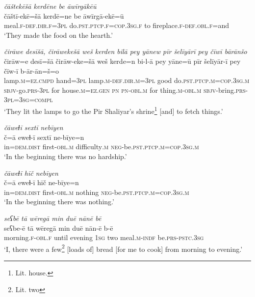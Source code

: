 \ea \label{ŽE.39}
\textit{čāštekēšā kerdēne be āwīrgākēū} \\ 
\gll čāštī-ekē=šā kerdē=ne be āwīrgā-ekē=ū \\ 
 meal\textsc{.f}\textsc{-def}\textsc{.dir}\textsc{.f}\textsc{=3pl} do\textsc{.pst}\textsc{.ptcp}\textsc{.f}\textsc{=cop}\textsc{.3sg}\textsc{.f} to fireplace\textsc{.f}\textsc{-def}\textsc{.obl}\textsc{.f}=and \\ 
\glt `They made the food on the hearth.'
\z 
 
\ea \label{ŽE.42}
\textit{čirāwe desīšā, čirāwekešā weš kerden bilā pey yānew pīr šelīyārī pey čīwī bārānšo} \\ 
\gll čirāw=e desī=šā čirāw-eke=šā weš kerde=n bi-l-ā pey yāne=ū pīr šelīyār-ī pey čīw-ī b-ār-ān=š=o \\ 
 lamp\textsc{.m}\textsc{=ez}\textsc{.cmpd} hand\textsc{=3pl} lamp\textsc{.m}\textsc{-def}\textsc{.dir}\textsc{.m}\textsc{=3pl} good do\textsc{.pst}\textsc{.ptcp}\textsc{.m}\textsc{=cop}\textsc{.3sg}\textsc{.m} \textsc{sbjv-}go\textsc{.prs}\textsc{-3pl} for house\textsc{.m}\textsc{\textsc{=ez.gen}} \textsc{pn} \textsc{pn}\textsc{-obl}\textsc{.m} for thing\textsc{.m}\textsc{-obl}\textsc{.m} \textsc{sbjv-}bring\textsc{.prs}\textsc{-3pl}\textsc{=3sg}\textsc{=compl} \\ 
\glt `They lit the lamps to go the Pir Shaliyar’s shrine\footnote{Lit. house.} [and] to fetch things.'
\z 
 
\ea \label{ŽE.56}
\textit{čāweɫī sextī nebīyen} \\ 
\gll č=ā eweɫ-ī sextī ne-bīye=n \\ 
 in=\textsc{dem.dist} first\textsc{-obl}\textsc{.m} difficulty\textsc{.m} \textsc{neg-}be\textsc{.pst}\textsc{.ptcp}\textsc{.m}\textsc{=cop}\textsc{.3sg}\textsc{.m} \\ 
\glt `In the beginning there was no hardship.'
\z 
 
\ea \label{ŽE.57}
\textit{čāweɫī hīč nebīyen} \\ 
\gll č=ā eweɫ-ī hīč ne-bīye=n \\ 
 in=\textsc{dem.dist} first\textsc{-obl}\textsc{.m} nothing \textsc{neg-}be\textsc{.pst}\textsc{.ptcp}\textsc{.m}\textsc{=cop}\textsc{.3sg}\textsc{.m} \\ 
\glt `In the beginning there was nothing.'
\z 
 
\ea \label{ŽE.59}
\textit{seʕbē tā wēregā min duē nānē bē} \\ 
\gll seʕbe-ē tā wēregā min duē nān-ē b-ē \\ 
 morning\textsc{.f}\textsc{-obl}\textsc{.f} until evening \textsc{1sg} two meal\textsc{.m}\textsc{-indf} be\textsc{.prs}\textsc{-pstc}\textsc{.3sg} \\ 
\glt `I, there were a few\footnote{Lit. two} [loads of] bread [for me to cook] from morning to evening.'
\z 
 
